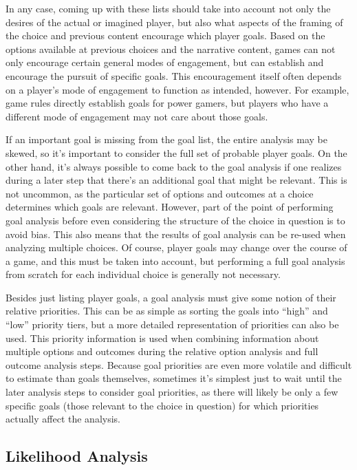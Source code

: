 In any case, coming up with these lists should take into account not only the desires of the actual or imagined player, but also what aspects of the framing of the choice and previous content encourage which player goals.
%
Based on the options available at previous choices and the narrative content, games can not only encourage certain general modes of engagement, but can establish and encourage the pursuit of specific goals.
%
This encouragement itself often depends on a player's mode of engagement to function as intended, however.
%
For example, game rules directly establish goals for power gamers, but players who have a different mode of engagement may not care about those goals.


If an important goal is missing from the goal list, the entire analysis may be skewed, so it's important to consider the full set of probable player goals.
%
On the other hand, it's always possible to come back to the goal analysis if one realizes during a later step that there's an additional goal that might be relevant. 
%
This is not uncommon, as the particular set of options and outcomes at a choice  determines which goals are relevant.
%
However, part of the point of performing goal analysis before even considering the structure of the choice in question is to avoid bias.
%
This also means that the results of goal analysis can be re-used when analyzing multiple choices.
%
Of course, player goals may change over the course of a game, and this must be taken into account, but performing a full goal analysis from scratch for each individual choice is generally not necessary.


Besides just listing player goals, a goal analysis must give some notion of their relative priorities.
%
This can be as simple as sorting the goals into ``high'' and ``low'' priority tiers, but a more detailed representation of priorities can also be used.
%
This priority information is used when combining information about multiple options and outcomes during the relative option analysis and full outcome analysis steps.
%
Because goal priorities are even more volatile and difficult to estimate than goals themselves, sometimes it's simplest just to wait until the later analysis steps to consider goal priorities, as there will likely be only a few specific goals (those relevant to the choice in question) for which priorities actually affect the analysis.


\subsection{Likelihood Analysis}

